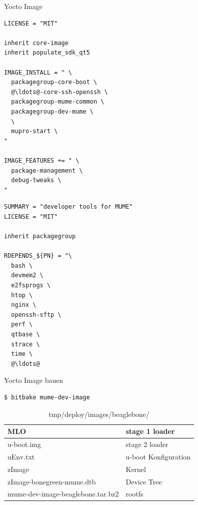 \begin{frame}[fragile]{Yocto Image}
	\begin{multicols}{2}
		\begin{lstlisting}[title=mume-dev-image.bb,frame=single,language=bitbake]
LICENSE = "MIT"

inherit core-image
inherit populate_sdk_qt5

IMAGE_INSTALL = " \
  packagegroup-core-boot \
  @\ldots@-core-ssh-openssh \
  packagegroup-mume-common \
  packagegroup-dev-mume \
  \
  mupro-start \
"

IMAGE_FEATURES += " \
  package-management \
  debug-tweaks \
"
		\end{lstlisting}
		\begin{lstlisting}[title=packagegroup-dev-mume.bb, frame=single, numbers=right, language=bitbake]
SUMMARY = "developer tools for MUME"
LICENSE = "MIT"

inherit packagegroup

RDEPENDS_${PN} = "\
  bash \
  devmem2 \
  e2fsprogs \
  htop \
  nginx \
  openssh-sftp \
  perf \
  qtbase \
  strace \
  time \
  @\ldots@
		\end{lstlisting}
	\end{multicols}
\end{frame}

\begin{frame}[fragile]{Yocto Image bauen}
	\begin{lstlisting}[frame=single,language=bash]
$ bitbake mume-dev-image
	\end{lstlisting}
	\begin{table}
		\caption{tmp/deploy/images/beaglebone/}
		\begin{tabular}{ll}
			\hline MLO & stage 1 loader \\ 
			\hline u-boot.img & stage 2 loader \\ 
			\hline uEnv.txt & u-boot Konfiguration \\ 
			\hline zImage & Kernel \\ 
			\hline zImage-bonegreen-mume.dtb & Device Tree \\ 
			\hline mume-dev-image-beaglebone.tar.bz2 & rootfs \\ 
			\hline 
		\end{tabular} 
	\end{table}
\end{frame}

